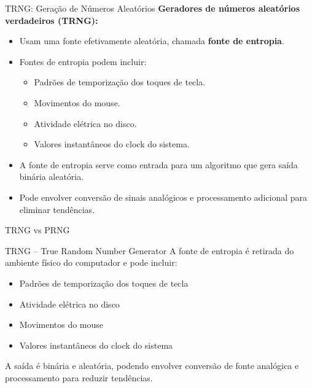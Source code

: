\begin{frame}{TRNG: Geração de Números Aleatórios}
    \textbf{Geradores de números aleatórios verdadeiros (TRNG):}
    \begin{itemize}
        \item Usam uma fonte efetivamente aleatória, chamada \textbf{fonte de entropia}.
        \item Fontes de entropia podem incluir:
              \begin{itemize}
                  \item Padrões de temporização dos toques de tecla.
                  \item Movimentos do mouse.
                  \item Atividade elétrica no disco.
                  \item Valores instantâneos do clock do sistema.
              \end{itemize}
        \item A fonte de entropia serve como entrada para um algoritmo que gera saída binária aleatória.
        \item Pode envolver conversão de sinais analógicos e processamento adicional para eliminar tendências.
    \end{itemize}



\end{frame}

\begin{frame}{TRNG vs PRNG}
    \begin{block}{TRNG – True Random Number Generator}
        A fonte de entropia é retirada do ambiente físico do computador e pode incluir:
        \begin{itemize}
            \item Padrões de temporização dos toques de tecla
            \item Atividade elétrica no disco
            \item Movimentos do mouse
            \item Valores instantâneos do clock do sistema
        \end{itemize}
        A saída é binária e aleatória, podendo envolver conversão de fonte analógica e processamento para reduzir tendências.
    \end{block}


\end{frame}


